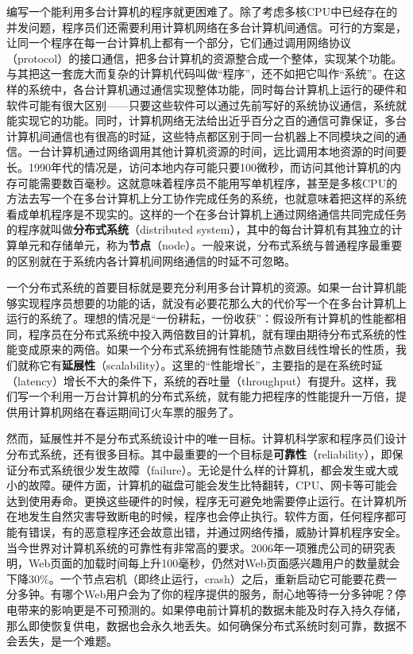 \documentclass[UTF8,AutoFakeBold=1,AutoFakeSlant,zihao=-4]{cucthesis}
\begin{document}
编写一个能利用多台计算机的程序就更困难了。除了考虑多核CPU中已经存在的并发问题，程序员们还需要利用计算机网络在多台计算机间通信。可行的方案是，让同一个程序在每一台计算机上都有一个部分，它们通过调用网络协议（protocol）的接口通信，把多台计算机的资源整合成一个整体，实现某个功能。与其把这一套庞大而复杂的计算机代码叫做“程序”，还不如把它叫作“系统”。在这样的系统中，各台计算机通过通信实现整体功能，同时每台计算机上运行的硬件和软件可能有很大区别——只要这些软件可以通过先前写好的系统协议通信，系统就能实现它的功能。同时，计算机网络无法给出近乎百分之百的通信可靠保证，多台计算机间通信也有很高的时延，这些特点都区别于同一台机器上不同模块之间的通信。一台计算机通过网络调用其他计算机资源的时间，远比调用本地资源的时间要长。1990年代的情况是，访问本地内存可能只要100微秒，而访问其他计算机的内存可能需要数百毫秒。这就意味着程序员不能用写单机程序，甚至是多核CPU的方法去写一个在多台计算机上分工协作完成任务的系统，也就意味着把这样的系统看成单机程序是不现实的。这样的一个在多台计算机上通过网络通信共同完成任务的程序就叫做\textbf{分布式系统}（distributed system），其中的每台计算机有其独立的计算单元和存储单元，称为\textbf{节点}（node）。一般来说，分布式系统与普通程序最重要的区别就在于系统内各计算机间网络通信的时延不可忽略。

一个分布式系统的首要目标就是要充分利用多台计算机的资源。如果一台计算机能够实现程序员想要的功能的话，就没有必要花那么大的代价写一个在多台计算机上运行的系统了。理想的情况是“一份耕耘，一份收获”：假设所有计算机的性能都相同，程序员在分布式系统中投入两倍数目的计算机，就有理由期待分布式系统的性能变成原来的两倍。如果一个分布式系统拥有性能随节点数目线性增长的性质，我们就称它有\textbf{延展性}（scalability）。这里的“性能增长”，主要指的是在系统时延（latency）增长不大的条件下，系统的吞吐量（throughput）有提升。这样，我们写一个利用一万台计算机的分布式系统，就有能力把程序的性能提升一万倍，提供用计算机网络在春运期间订火车票的服务了。

然而，延展性并不是分布式系统设计中的唯一目标。计算机科学家和程序员们设计分布式系统，还有很多目标。其中最重要的一个目标是\textbf{可靠性}（reliability），即保证分布式系统很少发生故障（failure）。无论是什么样的计算机，都会发生或大或小的故障。硬件方面，计算机的磁盘可能会发生比特翻转，CPU、网卡等可能会达到使用寿命。更换这些硬件的时候，程序无可避免地需要停止运行。在计算机所在地发生自然灾害导致断电的时候，程序也会停止执行。软件方面，任何程序都可能有错误，有的恶意程序还会故意出错，并通过网络传播，威胁计算机程序安全。当今世界对计算机系统的可靠性有非常高的要求。2006年一项雅虎公司的研究表明，Web页面的加载时间每上升100毫秒，仍然对Web页面感兴趣用户的数量就会下降30\%。一个节点宕机（即终止运行，crash）之后，重新启动它可能要花费一分多钟。有哪个Web用户会为了你的程序提供的服务，耐心地等待一分多钟呢？停电带来的影响更是不可预测的。如果停电前计算机的数据未能及时存入持久存储，那么即使恢复供电，数据也会永久地丢失。如何确保分布式系统时刻可靠，数据不会丢失，是一个难题。
\end{document}
